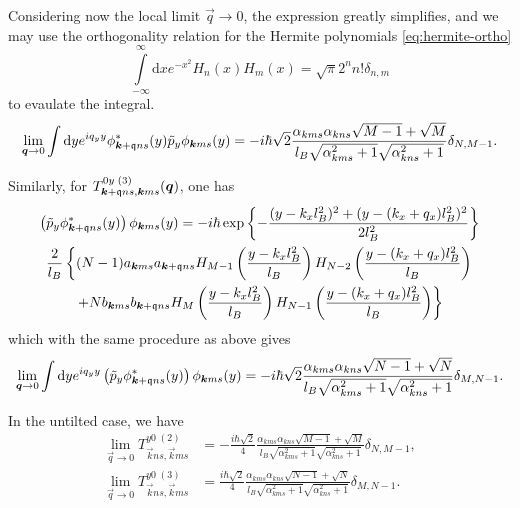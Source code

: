 Considering now the local limit \( \vec{q} \to 0 \), the expression greatly simplifies, and we may use the orthogonality relation for the Hermite polynomials \cref{eq:hermite-ortho}
\[
  \int\limits_{-\infty}^{\infty} \mathrm{d}x e^{-x^2} H_n(x)H_m(x) = \sqrt{\pi} 2^{n} n! \delta_{n,m}
\]
to evaulate the integral.
\begin{equation}
  \label{eq:146}
  \lim_{\bm{q} \to 0} \int \mathrm{d}y e^{iq_y y} \phi ^{*}_{\bm{k}+\mathfrak{q} ns}(y) \tilde{p}_y \phi _{\bm{k} ms}(y) =
  -i \hbar \sqrt{2}
  \frac{
    \alpha_{k m s} \alpha_{k n s} \sqrt{M-1}
    +
    \sqrt{M}
  }{
    {l_{B} \sqrt{\alpha_{k m s}^2 + 1}\sqrt{\alpha_{k n s} ^2 + 1}}
  }
  \delta_{N, M-1}.
\end{equation}

Similarly, for $T^{0y\; (3)}_{\bm{k}+\mathfrak{q}ns, \bm{k}ms} (\bm{q})$, one has
\begin{multline}
  \left( \tilde{p}_y \phi ^{*}_{\bm{k}+\mathfrak{q} ns}(y) \right)
  \phi _{\bm{k} m s}(y) =
  -i \hbar \exp \left\{
    - \frac{(y-k_xl_B^2)^2 + (y-(k_x + q_x) l_B^2)^2}{2 l_B^2}
  \right\}\\
  \frac{2}{l_{B}} \left\{
    (N-1) a_{\bm{k} m s} a_{\bm{k} + \mathfrak{q} n s} H_{M-1} \left( \frac{y-k_xl_B^2}{l_B} \right)H_{N-2} \left( \frac{y - (k_x + q_x) l_B^2}{l_B} \right) \right.\\
  \left. +
    N b_{\bm{k} m s} b_{\bm{k}+\mathfrak{q} n s} H_M \left( \frac{y - k_xl_B^2}{l_B} \right) H_{N-1}\left( \frac{y-(k_x+q_x) l_B^2}{l_B} \right)
  \right\}
\end{multline}
which with the same procedure as above gives
\begin{equation}
 \lim_{\bm{q}\to 0} \int \mathrm{d}y e^{iq_y y}
  \left( \tilde{p}_y \phi ^{*}_{\bm{k}+\mathfrak{q} ns}(y) \right)
  \phi _{\bm{k} m s}(y)
  =
  -i \hbar \sqrt{2}
  \frac{
    \alpha_{k m s} \alpha_{k n s} \sqrt{N-1}
    +
    \sqrt{N}
  }{
    {l_{B} \sqrt{\alpha_{k m s}^2 + 1}\sqrt{\alpha_{k n s} ^2 + 1}}
  }
  \delta_{M, N-1}.
\end{equation}

\begin{summary}\label{summary:notilt-otherterm}
  In the untilted case, we have
  \begin{align}
    \label{eq:71}
    \lim_{\vec{q} \to 0} T^{y0\; (2)}_{\vec{k} n s, \vec{k} m s} &= -\frac{i \hbar \sqrt{2}}{4}
        \frac{
          \alpha_{k m s} \alpha_{k n s} \sqrt{M-1}
          +
          \sqrt{M}
        }{
          {l_{B} \sqrt{\alpha_{k m s}^2 + 1}\sqrt{\alpha_{k n s} ^2 + 1}}
        }
                                                                   \delta_{N, M-1},\\
    \lim_{\vec{q} \to 0} T^{y0\; (3)}_{\vec{k} n s, \vec{k} m s} &= \frac{i \hbar \sqrt{2}}{4}
        \frac{
          \alpha_{k m s} \alpha_{k n s} \sqrt{N-1}
          +
          \sqrt{N}
        }{
          {l_{B} \sqrt{\alpha_{k m s}^2 + 1}\sqrt{\alpha_{k n s} ^2 + 1}}
        }
                                                                   \delta_{M, N-1}.
  \end{align}
\end{summary}

